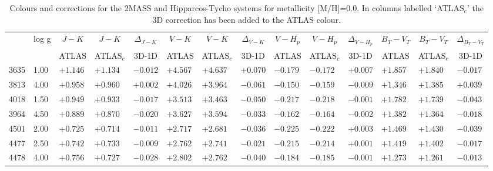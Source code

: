 \documentclass[]{aa}
\def\teff{$T\rm_{eff}$}
\begin{document}
\begin{appendix}
\begin{table*}
\caption{\label{2masshipm00}
Colours and corrections for the 2MASS and Hipparcos-Tycho systems for metallicity [M/H]=0.0. In columns labelled `ATLAS$_c$' the 3D correction
has been added to the ATLAS colour. }
\renewcommand{\tabcolsep}{3pt}
\tabskip=0pt
\begin{center}
\begin{tabular}{llllllllllllll}
\hline\noalign{\smallskip}
\multicolumn{1}{c}{\teff} & 
\multicolumn{1}{c}{log g} & 
\multicolumn{1}{c}{$J-K$} &
\multicolumn{1}{c}{$J-K$} &
\multicolumn{1}{c}{$\Delta_{J-K}$} &
\multicolumn{1}{c}{$V-K$} &
\multicolumn{1}{c}{$V-K$} &
\multicolumn{1}{c}{$\Delta_{V-K}$} &
\multicolumn{1}{c}{$V-H_p$} &
\multicolumn{1}{c}{$V-H_p$} &
\multicolumn{1}{c}{$\Delta_{V-H_p}$} &
\multicolumn{1}{c}{$B_T-V_T$} &
\multicolumn{1}{c}{$B_T-V_T$} &
\multicolumn{1}{c}{$\Delta_{B_T-V_T}$} \\
\multicolumn{2}{c}{ } &  
\multicolumn{1}{c}{ATLAS} &
\multicolumn{1}{c}{ATLAS$_c$}&
\multicolumn{1}{c}{3D-1D}&
\multicolumn{1}{c}{ATLAS} &
\multicolumn{1}{c}{ATLAS$_c$}&
\multicolumn{1}{c}{3D-1D}&
\multicolumn{1}{c}{ATLAS} &
\multicolumn{1}{c}{ATLAS$_c$}&
\multicolumn{1}{c}{3D-1D}&
\multicolumn{1}{c}{ATLAS} &
\multicolumn{1}{c}{ATLAS$_c$}&
\multicolumn{1}{c}{3D-1D} \\
\hline\noalign{\smallskip}
\hline\noalign{\smallskip}
3635  &1.00 &$ +1.146$ &$ +1.134$ &$ -0.012$ &$ +4.567$ &$ +4.637$ &$ +0.070$ &$ -0.179$ &$ -0.172$ &$ +0.007$ &$ +1.857$ &$ +1.840$ &$ -0.017$\\
3813  &4.00 &$ +0.958$ &$ +0.960$ &$ +0.002$ &$ +4.026$ &$ +3.964$ &$ -0.061$ &$ -0.150$ &$ -0.159$ &$ -0.009$ &$ +1.346$ &$ +1.385$ &$ +0.039$\\
4018  &1.50 &$ +0.949$ &$ +0.933$ &$ -0.017$ &$ +3.513$ &$ +3.463$ &$ -0.050$ &$ -0.217$ &$ -0.218$ &$ -0.001$ &$ +1.782$ &$ +1.739$ &$ -0.043$\\
3964  &4.50 &$ +0.889$ &$ +0.870$ &$ -0.020$ &$ +3.627$ &$ +3.594$ &$ -0.033$ &$ -0.162$ &$ -0.164$ &$ -0.002$ &$ +1.382$ &$ +1.364$ &$ -0.018$\\
4501  &2.00 &$ +0.725$ &$ +0.714$ &$ -0.011$ &$ +2.717$ &$ +2.681$ &$ -0.036$ &$ -0.225$ &$ -0.222$ &$ +0.003$ &$ +1.469$ &$ +1.430$ &$ -0.039$\\
4477  &2.50 &$ +0.742$ &$ +0.733$ &$ -0.009$ &$ +2.762$ &$ +2.741$ &$ -0.021$ &$ -0.215$ &$ -0.214$ &$ +0.001$ &$ +1.419$ &$ +1.402$ &$ -0.017$\\
4478  &4.00 &$ +0.756$ &$ +0.727$ &$ -0.028$ &$ +2.802$ &$ +2.762$ &$ -0.040$ &$ -0.184$ &$ -0.185$ &$ -0.001$ &$ +1.273$ &$ +1.261$ &$ -0.013$\\

\end{tabular}
\end{center}
\end{table*}
\end{appendix}
\end{document}
